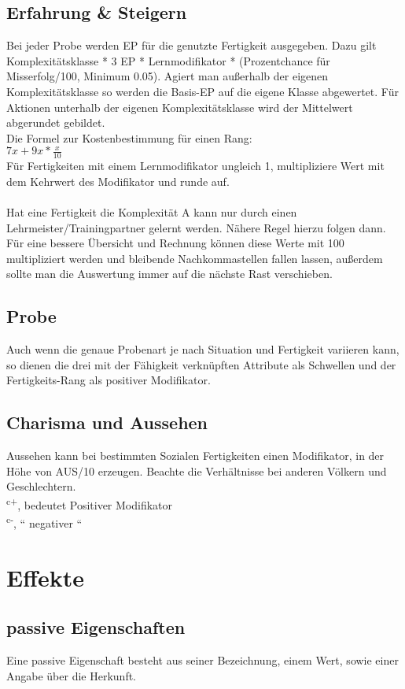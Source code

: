 \documentclass[a4paper,12pt,oneside]{book}
\begin{document}
\section{Erfahrung \& Steigern}
Bei jeder Probe werden EP für die genutzte Fertigkeit ausgegeben. Dazu gilt Komplexitätsklasse * 3 EP * Lernmodifikator * (Prozentchance für Misserfolg/100, Minimum 0.05). Agiert man außerhalb der eigenen Komplexitätsklasse so werden die Basis-EP auf die eigene Klasse abgewertet. Für Aktionen unterhalb der eigenen Komplexitätsklasse wird der Mittelwert abgerundet gebildet.
\\Die Formel zur Kostenbestimmung für einen Rang:
\\$7x+9x*\frac{x}{10}$
\\Für Fertigkeiten mit einem Lernmodifikator ungleich 1, multipliziere Wert mit dem Kehrwert des Modifikator und runde auf.
\\
\\Hat eine Fertigkeit die Komplexität A kann nur durch einen Lehrmeister/Trainingpartner gelernt werden. Nähere Regel hierzu folgen dann.
\\Für eine bessere Übersicht und Rechnung können diese Werte mit 100 multipliziert werden und bleibende Nachkommastellen fallen lassen, außerdem sollte man die Auswertung immer auf die nächste Rast verschieben.
\section{Probe}
Auch wenn die genaue Probenart je nach Situation und Fertigkeit variieren kann, so dienen die drei mit der Fähigkeit verknüpften Attribute als Schwellen und der Fertigkeits-Rang als positiver Modifikator.
\section{Charisma und Aussehen}
Aussehen kann bei bestimmten Sozialen Fertigkeiten einen Modifikator, in der Höhe von AUS/10 erzeugen. Beachte die Verhältnisse bei anderen Völkern und Geschlechtern.
\\\textsuperscript{c+}, bedeutet Positiver Modifikator
\\\textsuperscript{c-}, `` negativer ``

\chapter{Effekte}
\section{passive Eigenschaften}
Eine passive Eigenschaft besteht aus seiner Bezeichnung, einem Wert, sowie einer Angabe über die Herkunft.
\end{document}
